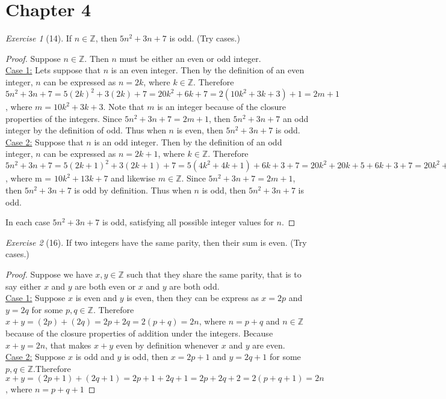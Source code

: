\documentclass[12pt]{amsart}
\theoremstyle{remark}
\newtheorem*{exercise}{Exercise}%
\def\ZZ{\ensuremath{\mathbb Z}}
\theoremstyle{mycomment}
\begin{document}
\thispagestyle{fancy}
\section*{Chapter 4}
\begin{exercise}[14] If $n\in\ZZ$, then $5n^{2}+3n+7$ is odd. (Try cases.)
\begin{proof}
Suppose $n \in \ZZ$. Then $n$ must be either an even or odd integer. 
\\ \underline{Case 1:} Lets suppose that $n$ is an even integer. Then by the definition of an even integer, $n$ can be expressed as $n = 2k$, where $k \in \ZZ$. Therefore $5n^2 + 3n + 7 = 5(2k)^2 + 3(2k) + 7 = 20k^2 + 6k + 7 =2(10k^2 + 3k + 3) + 1 = 2m + 1$, where $m = 10k^2 + 3k + 3$. Note that $m$ is an integer because of the closure properties of the integers. Since $5n^{2}+3n+7 = 2m + 1$, then $5n^{2}+3n+7$ an odd integer by the definition of odd. Thus when $n$ is even, then $5n^{2}+3n+7$ is odd.
\\ \underline{Case 2:} Suppose that $n$ is an odd integer. Then by the definition of an odd integer, $n$ can be expressed as $n = 2k + 1$, where $k \in \ZZ$. Therefore $5n^2 + 3n + 7 = 5(2k+1)^2 + 3(2k+1) + 7 = 5(4k^2 +4k + 1)+ 6k+ 3 + 7 = 20k^2 + 20k + 5 + 6k + 3 + 7 = 20k^2 + 26k + 15 = 2(10k^2 + 13k + 7) + 1 = 2m + 1$, where m = $10k^2 + 13k +7$ and likewise $m \in \ZZ$. Since $5n^2 + 3n + 7 = 2m +1$, then $5n^2 + 3n + 7$ is odd by definition. Thus when $n$ is odd, then $5n^2 + 3n + 7$ is odd. 

In each case $5n^2 + 3n + 7$ is odd, satisfying all possible integer values for $n$.
\end{proof}
\end{exercise}

\begin{exercise}[16] If two integers have the same parity, then their sum is even. (Try cases.)
\begin{proof}
Suppose we have $x,y \in \ZZ$ such that they share the same parity, that is to say either $x$ and $y$ are both even or $x$ and $y$ are both odd. \\
\underline{Case 1:} Suppose $x$ is even and $y$ is even, then they can be express as $x = 2p$ and $y = 2q$ for some $p,q \in \ZZ$. Therefore $x + y = (2p) + (2q) = 2p + 2q = 2(p+q) = 2n$, where $n = p + q$ and $n \in \ZZ$ because of the closure properties of addition under the integers. Because $x + y = 2n$, that makes $x + y$ even by definition whenever $x$ and $y$ are even. \\
\underline{Case 2:} Suppose $x$ is odd and $y$ is odd, then $x = 2p + 1$ and $y = 2q + 1$ for some $p,q \in \ZZ$.Therefore $x + y = (2p + 1) + (2q + 1) = 2p + 1 + 2q + 1 = 2p + 2q + 2 = 2(p + q + 1) = 2n$, where $n = p + q + 1$
\end{proof}
\end{exercise}
\end{document}
